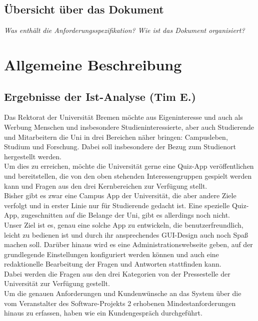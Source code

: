 \documentclass[fontsize=12pt,paper=a4,twoside]{scrartcl}
\newcommand{\highlight}[1]{\textcolor{blue}{\textbf{#1}}}
\newcommand{\nurlangversion}[0]{%
\ifthenelse{\boolean{langversion}}{\highlight{}}{\highlight{Entfällt in SWP-1}}}
\begin{document}
\subsection{Übersicht über das Dokument}
\nurlangversion

  {\em Was enthält die Anforderungsspezifikation? Wie ist das Dokument
  organisiert?}


\section{Allgemeine Beschreibung}
\label{ch:AllgemeineBeschreibung}

\subsection{Ergebnisse der Ist-Analyse (Tim E.)}
  
Das Rektorat der Universität Bremen möchte aus Eigeninteresse und auch als Werbung Menschen und insbesondere Studieninteressierte, aber auch Studierende und Mitarbeitern die Uni in drei Bereichen näher bringen: Campusleben, Studium und Forschung. Dabei soll insbesondere der Bezug zum Studienort hergestellt werden.\\
Um dies zu erreichen, möchte die Universität gerne eine Quiz-App veröffentlichen und bereitstellen, die von den oben stehenden Interessengruppen gespielt werden kann und Fragen aus den drei Kernbereichen zur Verfügung stellt.\\
Bisher gibt es zwar eine Campus App der Universität, die aber andere Ziele verfolgt und in erster Linie nur für Studierende gedacht ist. Eine spezielle Quiz-App, zugeschnitten auf die Belange der Uni, gibt es allerdings noch nicht. \\
Unser Ziel ist es, genau eine solche App zu entwickeln, die benutzerfreundlich, leicht zu bedienen ist und durch ihr ansprechendes GUI-Design auch noch Spaß machen soll. Darüber hinaus wird es eine Administrationswebseite geben, auf der grundlegende Einstellungen konfiguriert werden können und auch eine redaktionelle Bearbeitung der Fragen und Antworten stattfinden kann.\\
Dabei werden die Fragen aus den drei Kategorien von der Pressestelle der Universität zur Verfügung gestellt. \\
Um die genauen Anforderungen und Kundenwünsche an das System über die vom Veranstalter des Software-Projekts 2 erhobenen Mindestanforderungen hinaus zu erfassen, haben wie ein Kundengespräch durchgeführt.
\end{document}
